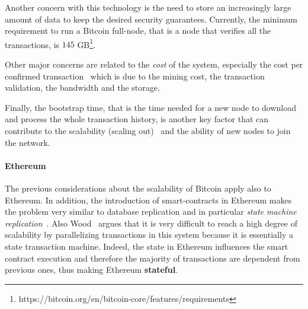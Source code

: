 Another concern with this technology is the need to store an increasingly large
amount of data to keep the desired security guarantees. Currently, the minimum
requirement to run a Bitcoin full-node, that is a node that verifies all the
transactions, is $145$
GB\footnote{https://bitcoin.org/en/bitcoin-core/features/requirements}.

Other major concerns are related to the \emph{cost} of the system, especially
the cost per confirmed transaction~\cite{bib:scaling-croman} which is due to the
mining cost, the transaction validation, the bandwidth and the storage.

Finally, the bootstrap time, that is the time needed for a new node to download
and process the whole transaction history, is another key factor that can
contribute to the scalability (scaling out)~\cite{bib:scaling-croman} and the
ability of new nodes to join the network.

\paragraph{Ethereum}
The previous considerations about the scalability of Bitcoin apply also to
Ethereum. In addition, the introduction of smart-contracts in Ethereum makes the
problem very similar to database replication and in particular \emph{state
machine replication}~\cite{bib:the-quest}. Also Wood~\cite{wood2018ethereum}
argues that it is very difficult to reach a high degree of scalability by
parallelizing transactions in this system because it is essentially a state
transaction machine. Indeed, the state in Ethereum influences the smart contract
execution and therefore the majority of transactions are dependent from previous
ones, thus making Ethereum \textbf{stateful}.

